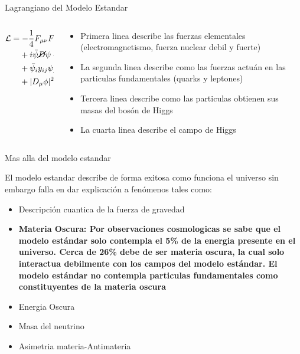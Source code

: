 \begin{frame}{Lagrangiano del Modelo Estandar}

\begin{columns}
\begin{column}{0.5\textwidth}
\Large{
\begin{align*}
\mathcal{L} &= - \frac{1}{4} F_{\mu \nu} F^{\mu \nu} \\
    &\phantom{{}=}+ i \bar{\psi} \cancel{D} \psi + h.c. \\
    &\phantom{{}=}+ \bar{\psi}_i y_{ij} \psi_j \phi + h.c. \\
    &\phantom{{}=}+ |D_\mu \phi|^2 - V(\phi)
\end{align*}
}
\end{column}
\begin{column}{0.5\textwidth}  %
    \begin{itemize}
        \item Primera linea describe las fuerzas elementales (electromagnetismo, fuerza nuclear debil y fuerte)
        \item La segunda linea describe como las fuerzas actu\'an en las particulas fundamentales (quarks y leptones)
        \item Tercera linea describe como las particulas obtienen sus masas del bos\'on de Higgs 
        \item La cuarta linea describe el campo de Higgs
    \end{itemize}
\end{column}
\end{columns}

\end{frame}


\begin{frame}{Mas alla del modelo estandar}

El modelo estandar describe de forma exitosa como funciona el universo sin embargo falla en dar explicaci\'on a fen\'omenos tales como: 

\begin{itemize}
    \item Descripci\'on cuantica de la fuerza de gravedad
    \item \textbf{Materia Oscura: Por observaciones cosmologicas se sabe que el modelo est\'andar solo contempla el 5\% de la energia presente en el universo.  Cerca de 26\% debe de ser materia oscura, la cual solo interactua debilmente con los campos del modelo est\'andar. El modelo est\'andar no contempla particulas fundamentales como constituyentes de la materia oscura}
    \item Energia Oscura
    \item Masa del neutrino
    \item Asimetria materia-Antimateria
\end{itemize}
    
\end{frame}
    
